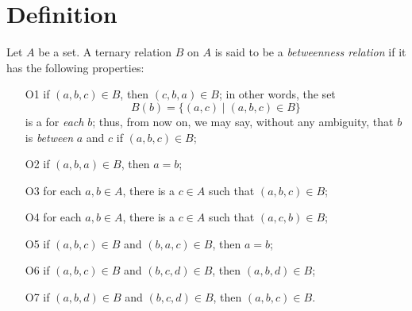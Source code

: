 \documentclass[12pt]{article}
\begin{document}
\section{Definition}
 Let $A$ be a set.  A ternary relation $B$ on
$A$ is said to be a \emph{betweenness relation} if it has the following properties:
\begin{enumerate}
\item[O1] if $(a,b,c)\in B$, then $(c,b,a)\in B$; in other words, the set $$B(b)=
\lbrace (a,c)\mid (a,b,c)\in B\rbrace$$ is a  for \emph{each}
$b$;  thus, from now on, we may say, without any ambiguity, that $b$
is \emph{between} $a$ and $c$ if $(a,b,c)\in B$;
\item[O2] if $(a,b,a)\in B$, then $a=b$;
\item[O3] for each $a,b\in A$, there is a $c\in A$ such that $(a,b,c)\in B$;
\item[O4]for each $a,b\in A$, there is a $c\in A$ such that $(a,c,b)\in B$;
\item[O5] if $(a,b,c)\in B$ and $(b,a,c)\in B$, then $a=b$;
\item[O6] if $(a,b,c)\in B$ and $(b,c,d)\in B$, then $(a,b,d)\in B$;
\item[O7] if $(a,b,d)\in B$ and $(b,c,d)\in B$, then $(a,b,c)\in B$.
\end{enumerate}
\end{document}
